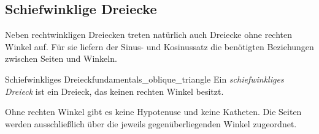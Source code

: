 \subsection{Schiefwinklige Dreiecke}
\label{subsec:fundamentals_oblique_triangles}

Neben rechtwinkligen Dreiecken treten natürlich auch Dreiecke ohne rechten Winkel auf. Für
sie liefern der Sinus- und Kosinussatz die benötigten Beziehungen zwischen Seiten
und Winkeln.

\begin{DefinitionBox}{Schiefwinkliges Dreieck}{fundamentals_oblique_triangle}
  Ein \emph{schiefwinkliges Dreieck}  ist ein
  Dreieck, das keinen rechten Winkel besitzt.

  \begin{center}
  \end{center}
\end{DefinitionBox}

\begin{RemarkBox}
  Ohne rechten Winkel gibt es keine Hypotenuse und keine Katheten. Die Seiten
  werden ausschließlich über die jeweils gegenüberliegenden Winkel
  zugeordnet.
\end{RemarkBox}



